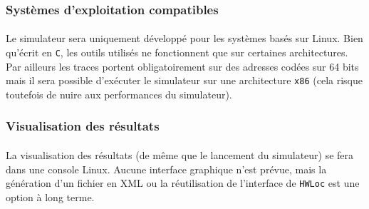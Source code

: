 \subsubsection{Systèmes d'exploitation compatibles}
\paragraph{}
Le simulateur sera uniquement développé pour les systèmes basés sur Linux. Bien qu'écrit en \texttt{C}, les outils utilisés ne fonctionnent que sur certaines architectures. Par ailleurs les traces portent obligatoirement sur des adresses codées sur 64 bits mais il sera possible d'exécuter le simulateur sur une architecture \verb!x86! (cela risque toutefois de nuire aux performances du simulateur).

\subsubsection{Visualisation des résultats}
\paragraph{}
La visualisation des résultats (de même que le lancement du simulateur) se fera dans une console Linux. Aucune interface graphique n'est prévue, mais la génération d'un fichier en XML ou la réutilisation de l'interface de \texttt{HWLoc} est une option à long terme.
